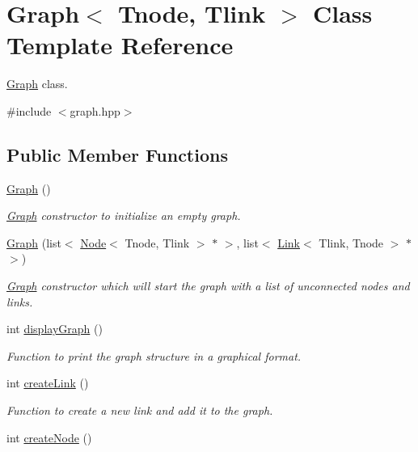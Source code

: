 \hypertarget{classGraph}{\section{Graph$<$ Tnode, Tlink $>$ Class Template Reference}
\label{classGraph}
}


\hyperlink{classGraph}{Graph} class.  




{\ttfamily \#include $<$graph.\+hpp$>$}

\subsection*{Public Member Functions}
\begin{DoxyCompactItemize}
\item 
\hyperlink{classGraph_a083bf42042f9082408dd0d38951bf0e8}{Graph} ()
\begin{DoxyCompactList}\small\item\em \hyperlink{classGraph}{Graph} constructor to initialize an empty graph. \end{DoxyCompactList}\item 
\hypertarget{classGraph_aaa7b66697aa3278022f6dbd804e44028}{\hyperlink{classGraph_aaa7b66697aa3278022f6dbd804e44028}{Graph} (list$<$ \hyperlink{classNode}{Node}$<$ Tnode, Tlink $>$ $\ast$ $>$, list$<$ \hyperlink{classLink}{Link}$<$ Tlink, Tnode $>$ $\ast$ $>$)}\label{classGraph_aaa7b66697aa3278022f6dbd804e44028}

\begin{DoxyCompactList}\small\item\em \hyperlink{classGraph}{Graph} constructor which will start the graph with a list of unconnected nodes and links. \end{DoxyCompactList}\item 
int \hyperlink{classGraph_a50e03d4d8fe8e7ff2a231871f8cd6356}{display\+Graph} ()
\begin{DoxyCompactList}\small\item\em Function to print the graph structure in a graphical format. \end{DoxyCompactList}\item 
\hypertarget{classGraph_a495ce01388ef7c259ab3c35f2414bd76}{int \hyperlink{classGraph_a495ce01388ef7c259ab3c35f2414bd76}{create\+Link} ()}\label{classGraph_a495ce01388ef7c259ab3c35f2414bd76}

\begin{DoxyCompactList}\small\item\em Function to create a new link and add it to the graph. \end{DoxyCompactList}\item 
\hypertarget{classGraph_a3a887e466c64e283afccde959493bd4a}{int \hyperlink{classGraph_a3a887e466c64e283afccde959493bd4a}{create\+Node} ()}\label{classGraph_a3a887e466c64e283afccde959493bd4a}


\end{DoxyCompactItemize}
